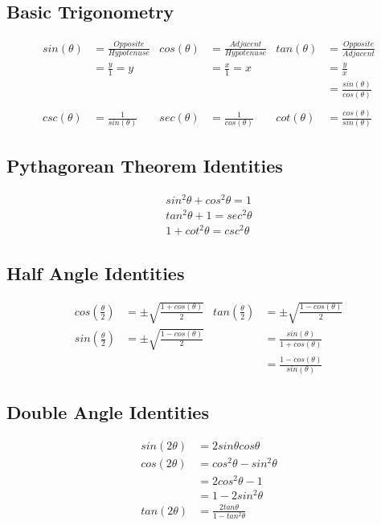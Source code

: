 \documentclass[12pt, letterpaper]{article}
\begin{document}
\subsection{Basic Trigonometry}
\begin{align*}
  sin(\theta) &= \frac{Opposite}{Hypotenuse}&
    cos(\theta) &= \frac{Adjacent}{Hypotenuse}&
    tan(\theta) &= \frac{Opposite}{Adjacent}\\
  &= \frac{y}{1} = y&
    &= \frac{x}{1} = x&
    &= \frac{y}{x}\\
  &&
    &&
    &= \frac{sin(\theta)}{cos(\theta)}\\
    \\
  csc(\theta) &= \frac{1}{sin(\theta)}&
    sec(\theta) &= \frac{1}{cos(\theta)}&
    cot(\theta) &= \frac{cos(\theta)}{sin(\theta)}
\end{align*}

\subsection{Pythagorean Theorem Identities}
\begin{gather*}
  sin^2 \theta + cos^2 \theta = 1\\
  tan^2 \theta + 1 = sec^2 \theta\\
  1 + cot^2 \theta = csc^2 \theta
\end{gather*}

\subsection{Half Angle Identities}
\begin{align*}
  cos(\frac{\theta}{2}) &= \pm \sqrt{\frac{1+cos(\theta)}{2}}&
    tan(\frac{\theta}{2}) &= \pm \sqrt{\frac{1-cos(\theta)}{2}}\\
  sin(\frac{\theta}{2}) &= \pm \sqrt{\frac{1-cos(\theta)}{2}}&
    &= \frac{sin(\theta)}{1+cos(\theta)}\\
  &&
    &= \frac{1-cos(\theta)}{sin(\theta)}
\end{align*}

\subsection{Double Angle Identities}
\begin{align*}
  sin (2\theta) &= 2sin\theta cos\theta\\
  cos (2\theta) &= cos^2 \theta - sin^2 \theta\\
  &= 2cos^2 \theta - 1\\
  &= 1 - 2sin^2 \theta\\
  tan (2\theta) &= \frac{2tan\theta}{1-tan^2 \theta}
\end{align*}
\end{document}
